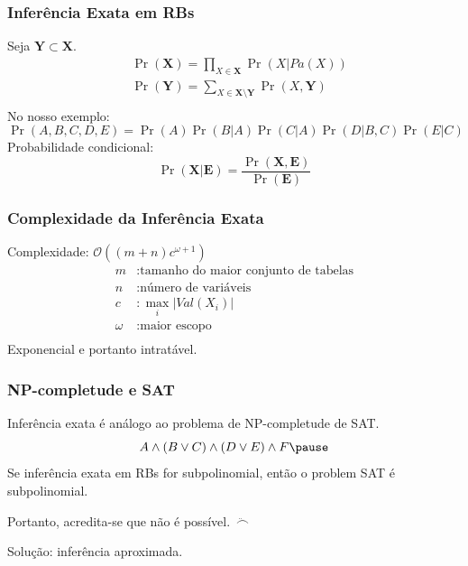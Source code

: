 \documentclass[10pt]{beamer}
\theoremstyle{plain}
\newcommand{\set}[1]{\mathbf{#1}}
\newcommand{\bigo}{\mathcal{O}}
\newcommand{\p}{\pause}
\begin{document}
\begingroup
\scriptsize
\begin{frame}
  \frametitle{Inferência Exata em RBs}

  Seja $\set{Y}\subset\set{X}$.
  \begin{align*}
    &\Pr(\set{X})=\prod_{X\in\set{X}} \Pr(X|Pa(X))\\
    &\Pr(\set{Y})=\sum_{X\in\set{X}\setminus\set{Y}} \Pr(X, \set{Y})\\
  \end{align*}
  No nosso exemplo:
  \begin{equation*}
    \Pr(A,B,C,D,E)=\Pr(A)\Pr(B|A)\Pr(C|A)\Pr(D|B,C)\Pr(E|C)
  \end{equation*}
  Probabilidade condicional:
  \begin{equation*}
    \Pr(\set{X}|\set{E})=\frac{\Pr(\set{X},\set{E})}{\Pr(\set{E})}
  \end{equation*}
\end{frame}
\endgroup

\begin{frame}
  \frametitle{Complexidade da Inferência Exata}

  Complexidade: $\bigo((m+n)c^{\omega+1})$
  \begin{align*}
    m &: \text{tamanho do maior conjunto de tabelas}\\
    n &: \text{número de variáveis}\\
    c &: \max_i |Val(X_i)|\\
    \omega &: \text{maior escopo}\\
  \end{align*}
  Exponencial e portanto intratável.
\end{frame}

\begin{frame}
  \frametitle{NP-completude e SAT}
  Inferência exata é análogo ao problema de NP-completude de SAT\@.\p
  \begin{equation*}
    A\wedge(B\vee C)\wedge(D\vee E)\wedge F\p
  \end{equation*}
  Se inferência exata em RBs for subpolinomial, então o problem SAT é subpolinomial.\p

  \p

  Portanto, acredita-se que não é possível.~$\ddot\frown$\p

  Solução: inferência aproximada.
\end{frame}
\end{document}
